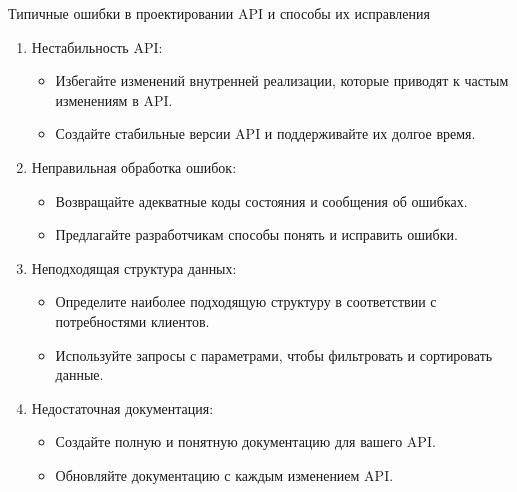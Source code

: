 \documentclass[
  ignorenonframetext,
  aspectratio=169,
  aspectratio=169]{beamer}
\providecommand{\tightlist}{%
  \setlength{\itemsep}{0pt}\setlength{\parskip}{0pt}}
\begin{document}
\begin{frame}{Типичные ошибки в проектировании API и способы их
исправления}
\protect\hypertarget{ux442ux438ux43fux438ux447ux43dux44bux435-ux43eux448ux438ux431ux43aux438-ux432-ux43fux440ux43eux435ux43aux442ux438ux440ux43eux432ux430ux43dux438ux438-api-ux438-ux441ux43fux43eux441ux43eux431ux44b-ux438ux445-ux438ux441ux43fux440ux430ux432ux43bux435ux43dux438ux44f}{}
\begin{enumerate}
\tightlist
\item
  Нестабильность API:

  \begin{itemize}
  \tightlist
  \item
    Избегайте изменений внутренней реализации, которые приводят к частым
    изменениям в API.
  \item
    Создайте стабильные версии API и поддерживайте их долгое время.
  \end{itemize}
\item
  Неправильная обработка ошибок:

  \begin{itemize}
  \tightlist
  \item
    Возвращайте адекватные коды состояния и сообщения об ошибках.
  \item
    Предлагайте разработчикам способы понять и исправить ошибки.
  \end{itemize}
\item
  Неподходящая структура данных:

  \begin{itemize}
  \tightlist
  \item
    Определите наиболее подходящую структуру в соответствии с
    потребностями клиентов.
  \item
    Используйте запросы с параметрами, чтобы фильтровать и сортировать
    данные.
  \end{itemize}
\item
  Недостаточная документация:

  \begin{itemize}
  \tightlist
  \item
    Создайте полную и понятную документацию для вашего API.
  \item
    Обновляйте документацию с каждым изменением API.
  \end{itemize}
\end{enumerate}
\end{frame}
\end{document}
